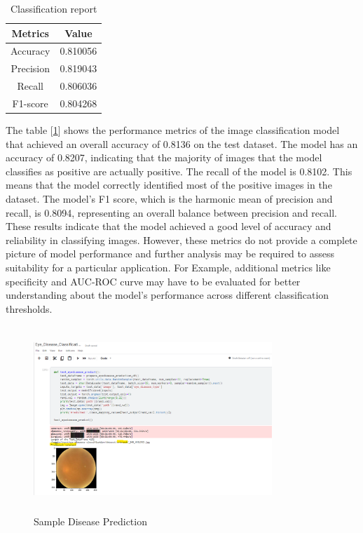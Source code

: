 \documentclass[conference]{IEEEtran}
\begin{document}
\vspace{5pt}
\begin{table}[h]
\centering
\begin{adjustbox}{width= 5cm, height=1.5cm}
\begin{tabular}{|c|c|}
\hline
\textbf{Metrics} & \textbf{Value} \\ \hline
Accuracy & 0.810056 \\ \hline
Precision & 0.819043 \\ \hline
Recall & 0.806036 \\ \hline
F1-score & 0.804268 \\ \hline
\end{tabular}
\end{adjustbox}
\vspace{5pt}
\caption{Classification report}
\label{tab:Classification report}
\end{table}

\vspace{5pt}
The table [\ref{tab:Classification report}] shows the performance metrics of the image classification model that achieved an overall accuracy of 0.8136 on the test dataset. The model has an accuracy of 0.8207, indicating that the majority of images that the model classifies as positive are actually positive. The recall of the model is 0.8102. This means that the model correctly identified most of the positive images in the dataset. The model's F1 score, which is the harmonic mean of precision and recall, is 0.8094, representing an overall balance between precision and recall. These results indicate that the model achieved a good level of accuracy and reliability in classifying images. However, these metrics do not provide a complete picture of model performance and further analysis may be required to assess suitability for a particular application. For Example, additional metrics like specificity and AUC-ROC curve may have to be evaluated for better understanding about the model's performance across different classification thresholds.

\begin{figure}[H]
    \centering
    \includegraphics[width=9cm, height=7cm]{Images/Test Image.png}
    \caption{Sample Disease Prediction}
    \label{fig:Sample Disease Prediction}
\end{figure}
\end{document}
